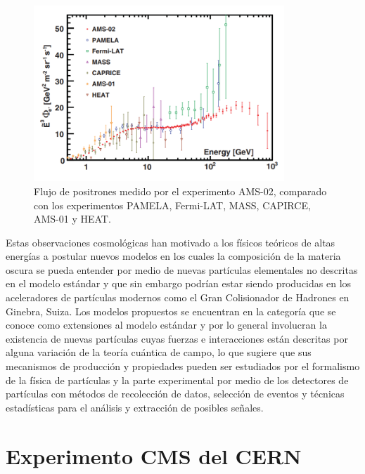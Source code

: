 \begin{figure}
    \centering
    \includegraphics[width=0.84\textwidth]{ANTECEDENTES/AMS_positronflux.png}
    \caption{Flujo de positrones medido por el experimento AMS-02, comparado con los experimentos PAMELA, Fermi-LAT, MASS, CAPIRCE, AMS-01 y HEAT.}
    \label{fig:AMS_positronflux}
\end{figure}

Estas observaciones cosmológicas han motivado a los físicos teóricos de altas energías a postular nuevos modelos en los cuales la composición de la materia oscura se pueda entender por medio de nuevas partículas elementales no descritas en el modelo estándar y que sin embargo podrían estar siendo producidas en los aceleradores de partículas modernos como el Gran Colisionador de Hadrones en Ginebra, Suiza. Los modelos propuestos se encuentran en la categoría que se conoce como extensiones al modelo estándar y por lo general involucran la existencia de nuevas partículas cuyas fuerzas e interacciones están descritas por alguna variación de la teoría cuántica de campo, lo que sugiere que sus mecanismos de producción y propiedades pueden ser estudiados por el formalismo de la física de partículas y la parte experimental por medio de los detectores de partículas con métodos de recolección de datos, selección de eventos y técnicas estadísticas para el análisis y extracción de posibles señales.

\section{Experimento CMS del CERN}

